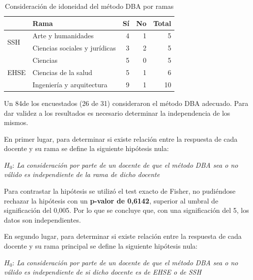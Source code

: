 \begin{table}[H]
  \begin{center}
  \begin{tabular}{| l | l | r | r | r |}
    \hline
    & Rama & Sí & No & Total \\
    \hline
    \hline
    \multirow{2}{2.5cm}{SSH} & Arte y humanidades & 4 & 1 & 5  \\
    \cline{2-5}
    & Ciencias sociales y jurídicas & 3 & 2 & 5  \\
    \hline
    \multirow{3}{2.5cm}{EHSE} & Ciencias & 5 & 0 & 5  \\
    \cline{2-5}
    & Ciencias de la salud & 5 & 1 & 6  \\
    \cline{2-5}
    & Ingeniería y arquitectura & 9 & 1 & 10 \\
    \hline
  \end{tabular}
\end{center}
\caption{Consideración de idoneidad del método DBA por ramas}
\label{tab:evalmetodo:encuesta:metodoDBA:rama}
\end{table}

Un 84\percentage{ }de los encuestados (26 de 31) consideraron el método DBA adecuado. Para dar validez a los resultados es necesario determinar la independencia de los mismos.

En primer lugar, para determinar si existe relación entre la respuesta de cada docente y su rama se define la siguiente hipótesis nula:

\medskip
\begin{mdframed}[style=hipotesis0]
$H_0$: \emph{La consideración por parte de un docente de que el método DBA sea o no válido es independiente de la rama de dicho docente}
\end{mdframed}

\medskip
Para contrastar la hipótesis se utilizó el test exacto de Fisher, no pudiéndose rechazar la hipótesis con un \textbf{p-valor de 0,6142}, superior al umbral de significación del 0,005. Por lo que se concluye que, con una significación del 5\percentage, los datos son independientes.

En segundo lugar, para determinar si existe relación entre la respuesta de cada docente y su rama principal se define la siguiente hipótesis nula:

\medskip
\begin{mdframed}[style=hipotesis0]
$H_0$: \emph{La consideración por parte de un docente de que el método DBA sea o no válido es independiente de si dicho docente es de EHSE o de SSH}
\end{mdframed}

